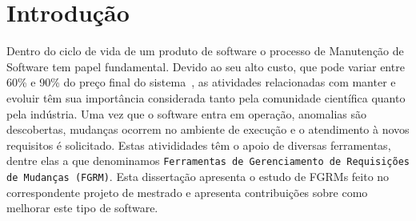 \chapter{Introdução}
\label{ch:intro}




Dentro do ciclo de vida de um produto de software o processo de Manutenção de
Software tem papel fundamental. Devido ao seu alto custo, que pode variar entre
60\% e 90\% do preço final do sistema~\cite{kaur2015review}, as atividades
relacionadas com manter e evoluir têm sua importância considerada tanto pela
comunidade científica quanto pela indústria. Uma vez que o software entra em
operação, anomalias são descobertas, mudanças ocorrem no ambiente de execução e
o atendimento à novos requisitos é solicitado. Estas ativididades têm o apoio de
diversas ferramentas, dentre elas a que denominamos \texttt{Ferramentas de
    Gerenciamento de Requisições de Mudanças (FGRM)}. Esta dissertação apresenta
o estudo de FGRMs feito no correspondente projeto de mestrado e apresenta
contribuições sobre como melhorar este tipo de software.

